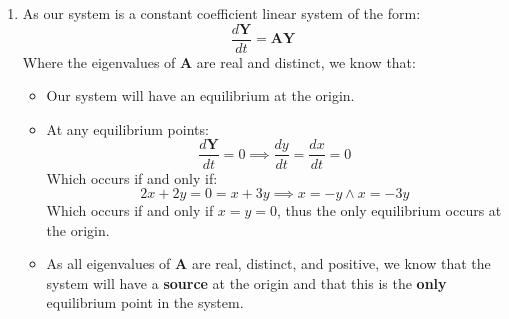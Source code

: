 \documentclass[a4paper, 11pt]{article}
\newcommand{\dydt}{\frac{dy}{dt}}
\newcommand{\dxdt}{\frac{dx}{dt}}
\begin{document}
\begin{enumerate}[label=(\alph*)]
  \item As our system is a constant coefficient linear system of the form: 
  $$\frac{d\mathbf{Y}}{dt}=\mathbf{AY}$$
  Where the eigenvalues of $\mathbf{A}$ are real and distinct, we know that: 
  \begin{itemize}
    \item Our system will have an equilibrium at the origin.
    
    \item At any equilibrium points: 
    $$\frac{d\mathbf{Y}}{dt}=0\implies\dydt=\dxdt=0$$
    Which occurs if and only if: 
    $$2x+2y=0=x+3y\implies x=-y\land x=-3y$$
    Which occurs if and only if $x=y=0$, thus the only equilibrium occurs at the origin.
    
    \item As all eigenvalues of $\mathbf{A}$ are real, distinct, and positive, we know that the system will have a \textbf{source} at the origin and that this is the \textbf{only} equilibrium point in the system. 
  \end{itemize}
\end{enumerate}

\pagebreak
\end{document}
